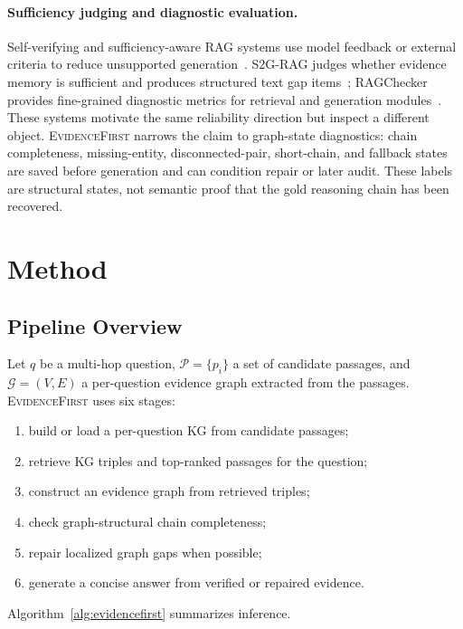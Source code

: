 \documentclass[runningheads]{llncs}
\newcommand{\sys}{\textsc{EvidenceFirst}\xspace}
\newcommand{\calG}{\mathcal{G}}
\newcommand{\calP}{\mathcal{P}}
\begin{document}
\paragraph{Sufficiency judging and diagnostic evaluation.}
Self-verifying and sufficiency-aware RAG systems use model feedback or external
criteria to reduce unsupported generation~\cite{asai2023selfrag,fairrag2025}.
S2G-RAG judges whether evidence memory is sufficient and produces structured
text gap items~\cite{s2grag2026}; RAGChecker provides fine-grained diagnostic
metrics for retrieval and generation modules~\cite{ru2024ragchecker}. These
systems motivate the same reliability direction but inspect a different object.
\sys narrows the claim to graph-state diagnostics: chain completeness,
missing-entity, disconnected-pair, short-chain, and fallback states are saved
before generation and can condition repair or later audit. These labels are
structural states, not semantic proof that the gold reasoning chain has been
recovered.

\section{Method}
\label{sec:method}

\subsection{Pipeline Overview}

Let $q$ be a multi-hop question, $\calP=\{p_i\}$ a set of candidate passages,
and $\calG=(V,E)$ a per-question evidence graph extracted from the passages.
\sys uses six stages:
\begin{enumerate}
    \item build or load a per-question KG from candidate passages;
    \item retrieve KG triples and top-ranked passages for the question;
    \item construct an evidence graph from retrieved triples;
    \item check graph-structural chain completeness;
    \item repair localized graph gaps when possible;
    \item generate a concise answer from verified or repaired evidence.
\end{enumerate}

Algorithm~\ref{alg:evidencefirst} summarizes inference.
\end{document}
